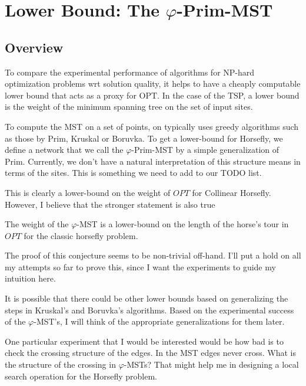 \documentclass[11.5pt]{report}
\begin{document}
\section{Lower Bound: The $\varphi$-Prim-MST}  

\subsection*{Overview}\hspace{0.1cm}
To compare the experimental performance of algorithms for NP-hard optimization 
problems wrt solution quality, it helps to have a cheaply computable lower bound 
that acts as a proxy for OPT. In the case of the TSP, a lower bound is the weight 
of the minimum spanning tree on the set of input sites.

To compute the MST on a set of points, on typically uses greedy algorithms such as 
those by Prim, Kruskal or Boruvka. To get a lower-bound for Horsefly, we define a 
network that we call the $\varphi$-Prim-MST by a simple generalization of Prim. 
Currently, we don't have a natural interpretation of this structure means in 
terms of the sites. This is something we need to add to our TODO list. 

\begin{center}
\end{center}

This is clearly a lower-bound on the weight of $OPT$ for Collinear Horsefly. However, 
I believe that the stronger statement is also true

\begin{fconj}
The weight of the $\varphi$-MST is a lower-bound on the length of the 
horse's tour in $OPT$ for the classic horsefly problem. 
\end{fconj}

The proof of this conjecture seems to be non-trivial off-hand. I'll put a hold on 
all my attempts so far to prove this, since I want the experiments to guide 
my intuition here. 

It is possible that there could be other lower bounds based on generalizing 
the steps in Kruskal's and Boruvka's algorithms. Based on the experimental 
success of the $\varphi$-MST's, I will think of the appropriate generalizations 
for them later. 

One particular experiment that I would be interested would be how bad is to check
the crossing structure of the edges. In the MST edges never cross. What is the 
structure of the crossing in $\varphi$-MSTs? That might help me in designing a local
search operation for the Horsefly problem. 
\end{document}
